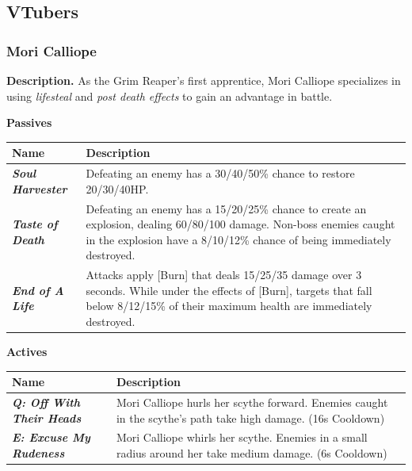 \documentclass[10pt, a4paper]{article}
\begin{document}
\begin{multicols}{2}
	\subsection{VTubers} \label{VTubers}
  	
  	\subsubsection{Mori Calliope}
  	
  	\textbf{Description.} As the Grim Reaper's first apprentice, Mori Calliope specializes in using \textit{lifesteal} and \textit{post death effects} to gain an advantage in battle.

	\textbf{Passives}
	
	\begin{center}
		\begin{tabular}{|p{2.7cm}|p{5.5cm}|}
			\hline
			\textbf{Name} & \textbf{Description} \\
			\hline
			\textit{\textbf{Soul Harvester}} & Defeating an enemy has a 30/40/50\% chance to restore 20/30/40HP. \\
			\textit{\textbf{Taste of Death}} & Defeating an enemy has a 15/20/25\% chance to create an explosion, dealing 60/80/100 damage. Non-boss enemies caught in the explosion have a 8/10/12\% chance of being immediately destroyed. \\
		
			\textit{\textbf{End of A Life}}  & Attacks apply [Burn] that deals 15/25/35 damage over 3 seconds. While under the effects of [Burn], targets that fall below 8/12/15\% of their maximum health are immediately destroyed. \\
			\hline
			
		\end{tabular}
	\end{center}
	
	\begin{center}
		\textbf{Actives}
	\end{center}
	
	\begin{center}
		\begin{tabular}{|p{2.7cm}|p{5.5cm}|}
			\hline
			\textbf{Name} & \textbf{Description} \\
			\hline
			\textit{\textbf{Q: Off With Their Heads}} & Mori Calliope hurls her scythe forward. Enemies caught in the scythe's path take high damage. (16s Cooldown)\\
			\textit{\textbf{E: Excuse My Rudeness}} & Mori Calliope whirls her scythe. Enemies in a small radius around her take medium damage. (6s Cooldown) \\
			\hline
		\end{tabular}
	\end{center}


\end{multicols}
\end{document}
